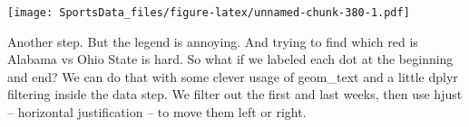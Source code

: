 \documentclass[
]{book}
\newenvironment{Shaded}{\begin{snugshade}}{\end{snugshade}}
\newcommand{\DataTypeTok}[1]{\textcolor[rgb]{0.13,0.29,0.53}{#1}}
\newcommand{\DecValTok}[1]{\textcolor[rgb]{0.00,0.00,0.81}{#1}}
\newcommand{\FloatTok}[1]{\textcolor[rgb]{0.00,0.00,0.81}{#1}}
\newcommand{\KeywordTok}[1]{\textcolor[rgb]{0.13,0.29,0.53}{\textbf{#1}}}
\newcommand{\NormalTok}[1]{#1}
\newcommand{\OperatorTok}[1]{\textcolor[rgb]{0.81,0.36,0.00}{\textbf{#1}}}
\newcommand{\StringTok}[1]{\textcolor[rgb]{0.31,0.60,0.02}{#1}}
\begin{document}
\texttt{[image: SportsData\_files/figure-latex/unnamed-chunk-380-1.pdf]}

Another step. But the legend is annoying. And trying to find which red is Alabama vs Ohio State is hard. So what if we labeled each dot at the beginning and end? We can do that with some clever usage of geom\_text and a little dplyr filtering inside the data step. We filter out the first and last weeks, then use hjust -- horizontal justification -- to move them left or right.

\begin{Shaded}
\end{Shaded}
\end{document}
